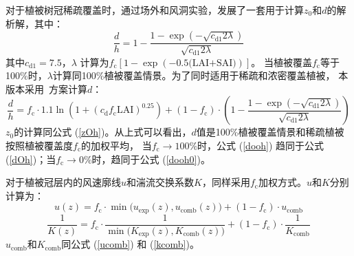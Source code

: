 对于植被树冠稀疏覆盖时，\citet{raupach1992drag,raupach1994simplified}通过场外和风洞实验，发展了一套用于计算$z_0$和$d$的解析解，其中：
\begin{equation}\label{dooh0}
  \frac{d}{h}=1-\frac{1-\exp \left(-\sqrt{c_{\mathrm{d1}} 2 \lambda}\right)}{\sqrt{c_{\mathrm{d1}} 2 \lambda}}
\end{equation}
其中$c_{\mathrm{d1}}=7.5$，$\lambda$%
计算为$f_{\mathrm {c}}\left[1-\exp{\left(-0.5\text{(LAI+SAI)}\right)}\right]$。
当植被覆盖$f_{\mathrm {c}}$等于100\%时，$\lambda$计算同100\%植被覆盖情景。为了同时适用于稀疏和浓密覆盖植被，
本版本采用~\citet{dai2019different}方案计算$d$：
\begin{equation}\label{dooh}
  \frac{d}{h}=f_{\mathrm{c}} \cdot 1.1 \ln \left(1+\left(c_{\mathrm{d}} f_{\mathrm{c}} \text{LAI}\right)^{0.25}\right)+\left(1-f_{\mathrm{c}}\right) \cdot\left(1-\frac{1-\exp \left(-\sqrt{c_{\mathrm{d1}} 2 \lambda}\right)}{\sqrt{c_{\mathrm{d1}} 2 \lambda}}\right)
\end{equation}
$z_0$的计算同公式 (\ref{zOh})。从上式可以看出，$d$值是100\%植被覆盖情景和稀疏植被按照植被覆盖度$f_{\mathrm {c}}$的加权平均，
当$f_{\mathrm {c}}\rightarrow100\%$时，公式 (\ref{dooh}) 趋同于公式 (\ref{dOh})；当$f_{\mathrm {c}}\rightarrow0\%$时，趋同于公式 (\ref{dooh0})。


对于植被冠层内的风速廓线$u$和湍流交换系数$K$，同样采用$f_{\mathrm {c}}$加权方式。$u$和$K$分别计算为：
\begin{equation}
  u(z)=f_{\mathrm{c}} \cdot \min \big(u_{\mathrm{\exp }}(z), u_{\mathrm{comb}}(z)\big)+\left(1-f_{\mathrm{c}}\right) \cdot u_{\mathrm{comb}}
\end{equation}
\begin{equation}
  \frac{1}{K(z)}=f_{\mathrm{c}} \cdot \frac{1}{\min \big(K_{\mathrm{\exp}}(z), K_{\mathrm{comb}}(z)\big)}+\left(1-f_{\mathrm{c}}\right) \cdot \frac{1}{K_{\mathrm{comb}}}
\end{equation}
$u_{\mathrm{comb}}$和$K_{\mathrm{comb}}$同公式 (\ref{ucomb}) 和 (\ref{kcomb})。

